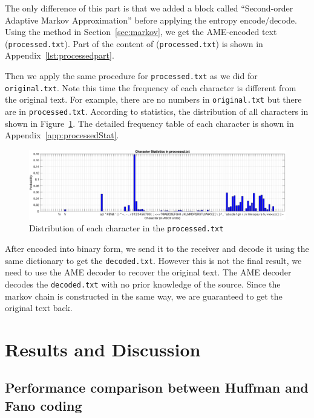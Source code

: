 \documentclass[12pt,twoside]{article}
\begin{document}
The only difference of this part is that we added a block called ``Second-order Adaptive Markov Approximation'' before applying the entropy encode/decode. Using the method in Section~\ref{sec:markov}, we get the AME-encoded text (\texttt{processed.txt}). Part of the content of (\texttt{processed.txt}) is shown in Appendix~\ref{lst:processedpart}.

Then we apply the same procedure for \texttt{processed.txt} as we did for \texttt{original.txt}. Note this time the frequency of each character is different from the original text. For example, there are no numbers in \texttt{original.txt} but there are in \texttt{processed.txt}. According to statistics, the distribution of all characters in shown in Figure~\ref{fig:processedStat}. The detailed frequency table of each character is shown in Appendix~\ref{app:processedStat}.

\begin{figure}[h!]
    \centering
    \includegraphics[width=\textwidth]{processedStat.png}
    \caption{Distribution of each character in the \texttt{processed.txt}}
    \label{fig:processedStat}
\end{figure}






After encoded into binary form, we send it to the receiver and decode it using the same dictionary to get the \texttt{decoded.txt}. However this is not the final result, we need to use the AME decoder to recover the original text. The AME decoder decodes the \texttt{decoded.txt} with no prior knowledge of the source. Since the markov chain is constructed in the same way, we are guaranteed to get the original text back.


\section{Results and Discussion}
\label{sec:result}

\subsection{Performance comparison between Huffman and Fano coding}
\end{document}
